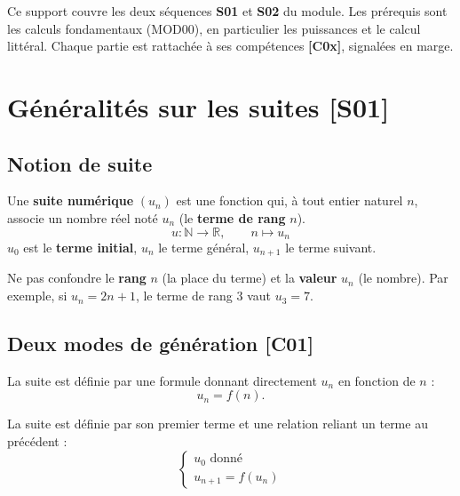 \documentclass[a4paper,11pt]{article}
\begin{document}
\begin{remarque}
Ce support couvre les deux séquences \textbf{S01} et \textbf{S02} du module. Les prérequis sont les calculs fondamentaux (MOD00), en particulier les puissances et le calcul littéral. Chaque partie est rattachée à ses compétences \textbf{[C0x]}, signalées en marge.
\end{remarque}

\newpage
\tableofcontents
\newpage

\section{Généralités sur les suites \hfill {\normalsize\color{uimmred}[S01]}}

\subsection{Notion de suite}

\begin{definition}
Une \textbf{suite numérique} $(u_n)$ est une fonction qui, à tout entier naturel $n$, associe un nombre réel noté $u_n$ (le \textbf{terme de rang} $n$).
\[
u : \mathbb{N} \rightarrow \mathbb{R}, \qquad n \mapsto u_n
\]
$u_0$ est le \textbf{terme initial}, $u_n$ le terme général, $u_{n+1}$ le terme suivant.
\end{definition}

\begin{remarque}
Ne pas confondre le \textbf{rang} $n$ (la place du terme) et la \textbf{valeur} $u_n$ (le nombre). Par exemple, si $u_n = 2n + 1$, le terme de rang $3$ vaut $u_3 = 7$.
\end{remarque}

\subsection{Deux modes de génération \hfill {\normalsize\color{uimmred}[C01]}}

\begin{definition}
La suite est définie par une formule donnant directement $u_n$ en fonction de $n$ :
\[
u_n = f(n).
\]
\end{definition}

\begin{definition}
La suite est définie par son premier terme et une relation reliant un terme au précédent :
\[
\begin{cases} u_0 \text{ donné} \\ u_{n+1} = f(u_n) \end{cases}
\]
\end{definition}
\end{document}
